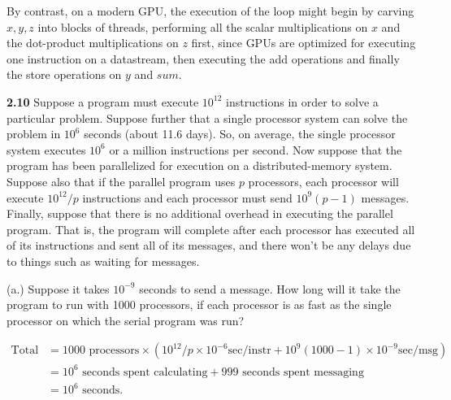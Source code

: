 \documentclass[11pt,epsfig,letterpaper]{article}
\begin{document}
\begin{enumerate}
            \quad By contrast, on a modern GPU, the execution of the loop might begin by carving $x, y, z$ into blocks of threads, performing all the scalar multiplications on $x$ and the dot-product multiplications on $z$ first, since GPUs are optimized for executing one instruction on a datastream, then executing the add operations and finally the store operations on $y$ and $sum$.





            \vspace{1pc}

            {\bf 2.10}  \>\>   Suppose a program must execute $10^{12}$ instructions in order to solve a particular problem. Suppose further that a single processor system can solve the problem in $10^{6}$ seconds (about 11.6 days). So, on average, the single processor system executes $10^{6}$ or a million instructions per second. Now suppose that the program has been parallelized for execution on a distributed-memory system. Suppose also that if the parallel program uses $p$ processors, each processor will execute $10^{12}/p$ instructions and each processor must send $10^{9}(p-1)$ messages. Finally, suppose that there is no additional overhead in executing the parallel program. That is, the program will complete after each processor has executed all of its instructions and sent all of its messages, and there won’t be any delays due to things such as waiting for messages.

            (a.) Suppose it takes $10^{-9}$ seconds to send a message. How long will it take the program to run with 1000 processors, if each processor is as fast as the single processor on which the serial program was run?
            \vspace{0.5pc}

            \begin{align*}
              \textrm{Total Time} &= 1000 \textrm{ processors} \times (10^{12}/p \times 10^{-6} \textrm{sec/instr} +  10^{9}(1000-1) \times 10^{-9}\textrm{sec/msg})\\
                                  &= 10^{6} \textrm{ seconds spent calculating} + 999 \textrm{ seconds spent messaging}\\
                                  &= 10^{6} \textrm{ seconds}.\\
            \end{align*}


\end{enumerate}
\end{document}
